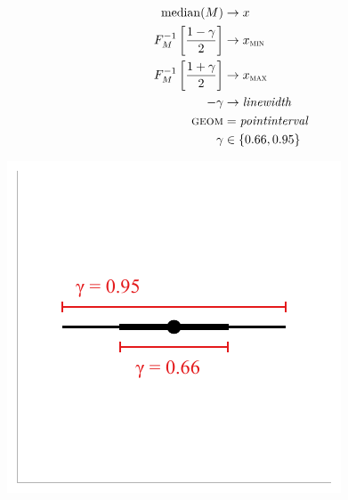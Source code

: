 \documentclass[journal]{vgtc}                     %
\begin{document}
\noindent
\begin{minipage}{.5\columnwidth}

\begin{align*}
\operatorname{median}(M) &\rightarrow x\\
F_M^{-1}\left[\frac{1 - \gamma}{2}\right] &\rightarrow x_\textsc{min}\\
F_M^{-1}\left[\frac{1 + \gamma}{2}\right] &\rightarrow x_\textsc{max}\\
-\gamma &\rightarrow \mathit{linewidth}\\
\textsc{geom} &= \mathit{pointinterval}\\
\gamma &\in \{0.66, 0.95\}
\end{align*}
\end{minipage}%
  \begin{minipage}{.4\columnwidth}
    \centering
    \includegraphics[width=1.2\columnwidth]{figs/3-stat_pointinterval_linewidth.pdf}
  \end{minipage}
\hfill\break
\end{document}
